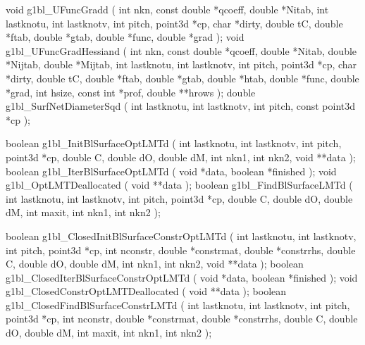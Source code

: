 \begin{listingC}
void g1bl_UFuncGradd ( int nkn, const double *qcoeff, double *Nitab,
                       int lastknotu, int lastknotv,
                       int pitch, point3d *cp, char *dirty,
                       double tC, double *ftab, double *gtab,
                       double *func, double *grad );
void g1bl_UFuncGradHessiand ( int nkn, const double *qcoeff,
                  double *Nitab, double *Nijtab, double *Mijtab,
                  int lastknotu, int lastknotv,  
                  int pitch, point3d *cp, char *dirty,
                  double tC, double *ftab, double *gtab,
                  double *htab, double *func, double *grad,
                  int hsize, const int *prof, double **hrows );
double g1bl_SurfNetDiameterSqd ( int lastknotu, int lastknotv,
                                 int pitch, const point3d *cp );
\end{listingC}

\begin{listingC}
boolean g1bl_InitBlSurfaceOptLMTd ( int lastknotu, int lastknotv,
                                    int pitch, point3d *cp,
                                    double C, double dO, double dM,
                                    int nkn1, int nkn2,
                                    void **data );
boolean g1bl_IterBlSurfaceOptLMTd ( void *data, boolean *finished );
void g1bl_OptLMTDeallocated ( void **data );
boolean g1bl_FindBlSurfaceLMTd ( int lastknotu, int lastknotv,
                                 int pitch, point3d *cp,
                                 double C, double dO, double dM,
                                 int maxit, int nkn1, int nkn2 );
\end{listingC}

\begin{listingC}
boolean g1bl_ClosedInitBlSurfaceConstrOptLMTd (
                 int lastknotu, int lastknotv, int pitch, point3d *cp,
                 int nconstr, double *constrmat, double *constrrhs,   
                 double C, double dO, double dM, int nkn1, int nkn2,  
                 void **data );
boolean g1bl_ClosedIterBlSurfaceConstrOptLMTd ( void *data,
                 boolean *finished );
void g1bl_ClosedConstrOptLMTDeallocated ( void **data );
boolean g1bl_ClosedFindBlSurfaceConstrLMTd (
                 int lastknotu, int lastknotv, int pitch, point3d *cp,
                 int nconstr, double *constrmat, double *constrrhs,   
                 double C, double dO, double dM,
                 int maxit, int nkn1, int nkn2 );
\end{listingC}


